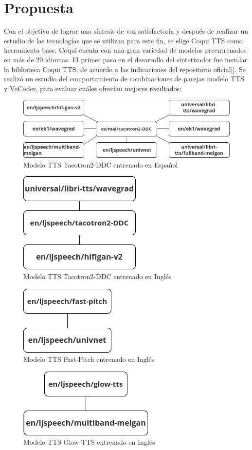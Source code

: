 \chapter{Propuesta}\label{chapter:proposal}

Con el objetivo de lograr una síntesis de voz satisfactoria y después de realizar un estudio de las tecnologías que se utilizan para este fin, se elige Coqui TTS como herramienta base. Coqui cuenta con una gran variedad de modelos preentrenados en más de 20 idiomas.  
El primer paso en el desarrollo del sintetizador fue instalar la biblioteca Coqui TTS, de acuerdo a las indicaciones del repositorio oficial[\cite{coqui-doc}]. Se realizó un estudio del comportamiento de combinaciones de parejas modelo TTS y VoCoder, para evaluar cuáles ofrecían mejores resultados:

\begin{figure}[H]
	\centering
	\includegraphics[width=0.7\linewidth]{Graphics/es_mai}
	\caption{Modelo TTS Tacotron2-DDC entrenado en Español}
	\label{esmai}
\end{figure}

\begin{figure}[H]
	\centering
	\includegraphics[width=0.3\linewidth]{Graphics/en_ljspeech}
	\caption{Modelo TTS Tacotron2-DDC entrenado en Inglés}
	\label{fig:enljspeech}
\end{figure}

\begin{figure}[H]
	\centering
	\includegraphics[width=0.3\linewidth]{Graphics/fastpitch}
	\caption{Modelo TTS Fast-Pitch entrenado en Inglés}
	\label{fig:fastpitch}
\end{figure}
\begin{figure}[H]
	\centering
	\includegraphics[width=0.4\linewidth]{Graphics/glow_tts}
	\caption{Modelo TTS Glow-TTS entrenado en Inglés}
	\label{fig:glowtts}
\end{figure}


